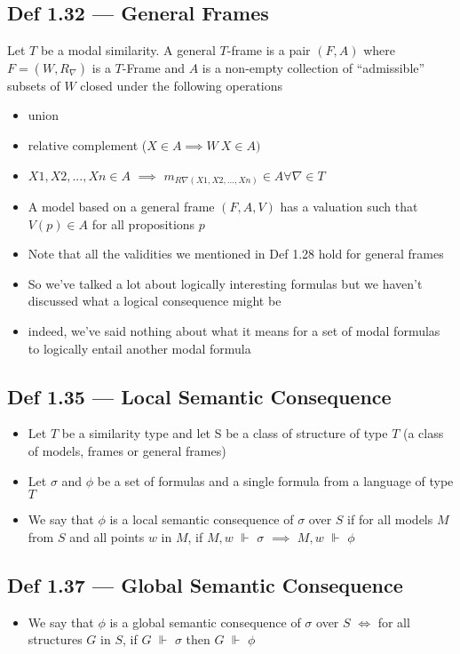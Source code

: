 \documentclass[10pt, a4paper, twoside]{article}
\begin{document}
\subsection{Def 1.32 --- General Frames}
Let $T$ be a modal similarity. A general $T$-frame is a pair $(F, A)$ where $F=(W,R_\nabla)$ is a $T$-Frame and $A$ is a non-empty collection of “admissible” subsets of $W$ closed under the following operations
\begin{itemize}
  \item union
  \item relative complement ($X \in A \implies W \ X \in A)$
  \item $X1,X2,...,Xn \in A$ $\implies$ $m_{R\nabla(X1,X2,...,Xn)} \in A \forall \nabla \in T$
  \item A model based on a general frame $(F, A, V)$ has a valuation such that $V(p) \in A$ for all propositions $p$
  \item Note that all the validities we mentioned in Def 1.28 hold for general frames
  \item So we’ve talked a lot about logically interesting formulas but we haven't discussed what a logical consequence might be
  \item indeed, we’ve said nothing about what it means for a set of modal formulas to logically entail another modal formula
\end{itemize}
\subsection{Def 1.35 --- Local Semantic Consequence}
\begin{itemize}
  \item Let $T$ be a similarity type and let S be a class of structure of type $T$ (a class of models, frames or general frames)
  \item Let $\sigma$ and $\phi$ be a set of formulas and a single formula from a language of type $T$
  \item We say that $\phi$ is a local semantic consequence of $\sigma$ over $S$ if for all models $M$ from $S$ and all points $w$ in $M$, if $M,w$ $\Vdash$ $\sigma$ $\implies$ $M, w$ $\Vdash$ $\phi$
\end{itemize}
\subsection{Def 1.37 --- Global Semantic Consequence}
\begin{itemize}
  \item We say that $\phi$ is a global semantic consequence of $\sigma$ over $S$ $\iff$ for all structures $G$ in $S$, if $G$ $\Vdash$ $\sigma$ then $G$ $\Vdash$ $\phi$
\end{itemize}
\end{document}
